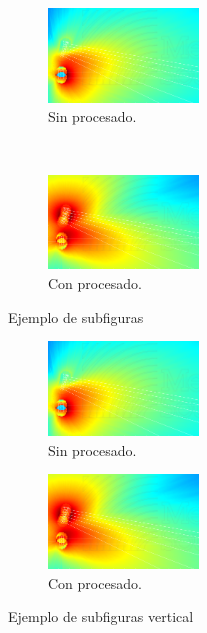 \begin{figure}[h]
    \centering
    \begin{subfigure}[b]{0.4\textwidth}
    	\centering
        \includegraphics[width=4cm]{archivos/subs-sin}
        \caption{Sin procesado.}
        \label{fig:gull1}
    \end{subfigure}
    ~ %
    \begin{subfigure}[b]{0.4\textwidth}
    	\centering
        \includegraphics[width=4cm]{archivos/subs-con}
        \caption{Con procesado.}
        \label{fig:tiger1}
    \end{subfigure}
    \caption{Ejemplo de subfiguras}\label{sistemass1}
\end{figure}

\begin{figure}[h]
    \centering
    \begin{subfigure}[b]{\textwidth}
    	\centering
        \includegraphics[width=4cm]{archivos/subs-sin}
        \caption{Sin procesado.}
        \label{fig:gull2}
    \end{subfigure}
    
    \begin{subfigure}[b]{\textwidth}
    	\centering
        \includegraphics[width=4cm]{archivos/subs-con}
        \caption{Con procesado.}
        \label{fig:tiger2}
    \end{subfigure}
    \caption{Ejemplo de subfiguras vertical}\label{sistemass2}
\end{figure}

